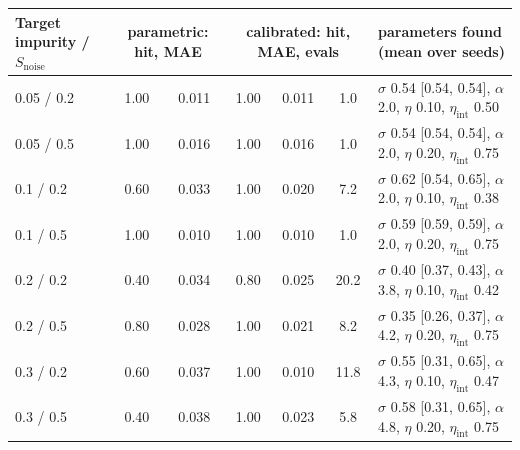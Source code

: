 \begin{tabular}{@{}lcccccl@{}}
\toprule
Target impurity / $S_{\text{noise}}$ & \multicolumn{2}{c}{parametric: hit, MAE} & \multicolumn{3}{c}{calibrated: hit, MAE, evals} & parameters found (mean over seeds) \\
\midrule
0.05 / 0.2 & 1.00 & 0.011 & 1.00 & 0.011 & 1.0 & $\sigma$ 0.54 [0.54, 0.54], $\alpha$ 2.0, $\eta$ 0.10, $\eta_{\text{int}}$ 0.50 \\
0.05 / 0.5 & 1.00 & 0.016 & 1.00 & 0.016 & 1.0 & $\sigma$ 0.54 [0.54, 0.54], $\alpha$ 2.0, $\eta$ 0.20, $\eta_{\text{int}}$ 0.75 \\
0.1 / 0.2 & 0.60 & 0.033 & 1.00 & 0.020 & 7.2 & $\sigma$ 0.62 [0.54, 0.65], $\alpha$ 2.0, $\eta$ 0.10, $\eta_{\text{int}}$ 0.38 \\
0.1 / 0.5 & 1.00 & 0.010 & 1.00 & 0.010 & 1.0 & $\sigma$ 0.59 [0.59, 0.59], $\alpha$ 2.0, $\eta$ 0.20, $\eta_{\text{int}}$ 0.75 \\
0.2 / 0.2 & 0.40 & 0.034 & 0.80 & 0.025 & 20.2 & $\sigma$ 0.40 [0.37, 0.43], $\alpha$ 3.8, $\eta$ 0.10, $\eta_{\text{int}}$ 0.42 \\
0.2 / 0.5 & 0.80 & 0.028 & 1.00 & 0.021 & 8.2 & $\sigma$ 0.35 [0.26, 0.37], $\alpha$ 4.2, $\eta$ 0.20, $\eta_{\text{int}}$ 0.75 \\
0.3 / 0.2 & 0.60 & 0.037 & 1.00 & 0.010 & 11.8 & $\sigma$ 0.55 [0.31, 0.65], $\alpha$ 4.3, $\eta$ 0.10, $\eta_{\text{int}}$ 0.47 \\
0.3 / 0.5 & 0.40 & 0.038 & 1.00 & 0.023 & 5.8 & $\sigma$ 0.58 [0.31, 0.65], $\alpha$ 4.8, $\eta$ 0.20, $\eta_{\text{int}}$ 0.75 \\
\bottomrule
\end{tabular}
